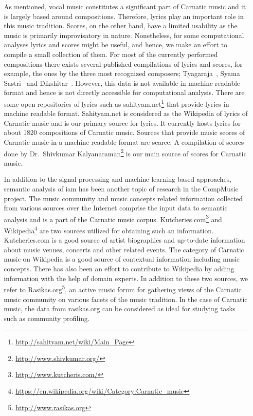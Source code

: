 As mentioned, vocal music constitutes a significant part of Carnatic music and it is largely based around compositions. Therefore, lyrics play an important role in this music tradition. Scores, on the other hand, have a limited usability as the music is primarily improvisatory in nature. Nonetheless, for some computational analyses lyrics and scores might be useful, and hence, we make an effort to compile a small collection of them. For most of the currently performed compositions there exists several published compilations of lyrics and scores, for example, the ones by the three most recognized composers; Tyagaraja~\citep{TKG_Rao_Tyagaraja}, Syama Sastri~\citep{TKG_Rao_syama} and Dikshitar~\citep{TKG_Rao_Muddusvami}. However, this data is not available in machine readable format and hence is not directly accessible for computational analysis. There are some open repositories of lyrics such as sahityam.net\footnote{\url{http://sahityam.net/wiki/Main_Page}} that provide lyrics in machine readable format. Sahityam.net is considered as the Wikipedia of lyrics of Carnatic music and is our primary source for lyrics. It currently hosts lyrics for about 1820 compositions of Carnatic music. Sources that provide music scores of Carnatic music in a machine readable format are scarce. A compilation of scores done by Dr.~Shivkumar Kalyanaraman\footnote{\url{http://www.shivkumar.org/}} is our main source of scores for Carnatic music.

In addition to the signal processing and machine learning based approaches, semantic analysis of \gls{iam} has been another topic of research in the CompMusic project. The music community and music concepts related information collected from various sources over the Internet comprise the input data to semantic analysis and is a part of the Carnatic music corpus. Kutcheries.com\footnote{\url{http://www.kutcheris.com/}} and Wikipedia\footnote{\url{https://en.wikipedia.org/wiki/Category:Carnatic_music}} are two sources utilized for obtaining such an information. Kutcheries.com is a good source of artist biographies and up-to-date information about music venues, concerts and other related events. The category of Carnatic music on Wikipedia is a good source of contextual information including music concepts. There has also been an effort to contribute to Wikipedia by adding information with the help of domain experts. In addition to these two sources, we refer to Rasikas.org\footnote{\url{http://www.rasikas.org}}, an active music forum for gathering views of the Carnatic music community on various facets of the music tradition. In the case of Carnatic music, the data from rasikas.org can be considered as ideal for studying tasks such as community profiling.


